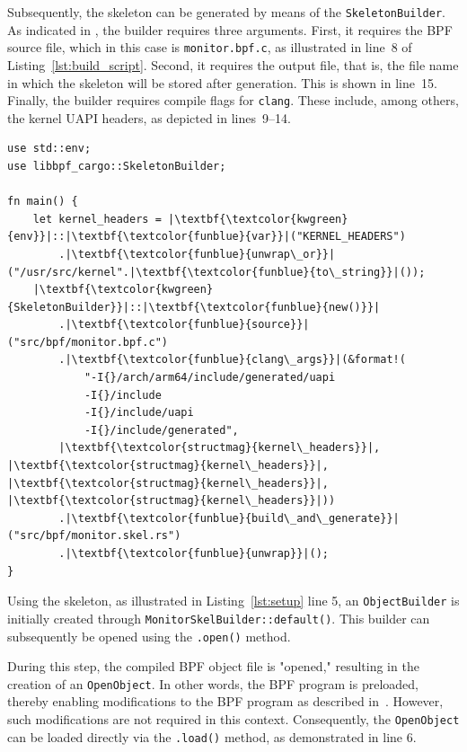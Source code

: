 Subsequently, the skeleton can be generated by means of the \texttt{SkeletonBuilder}.  
As indicated in \cite{skeleton}, the builder requires three arguments.  
First, it requires the \ac{BPF} source file, which in this case is \texttt{monitor.bpf.c}, as illustrated in line~8 of Listing~\ref{lst:build_script}.  
Second, it requires the output file, that is, the file name in which the skeleton will be stored after generation.  
This is shown in line~15.  
Finally, the builder requires compile flags for \texttt{clang}.  
These include, among others, the kernel UAPI headers, as depicted in lines~9--14.  

\begin{listing}[H]
    \centering
\begin{verbatim}
use std::env;
use libbpf_cargo::SkeletonBuilder;

fn main() {
    let kernel_headers = |\textbf{\textcolor{kwgreen}{env}}|::|\textbf{\textcolor{funblue}{var}}|("KERNEL_HEADERS")
        .|\textbf{\textcolor{funblue}{unwrap\_or}}|("/usr/src/kernel".|\textbf{\textcolor{funblue}{to\_string}}|());
    |\textbf{\textcolor{kwgreen}{SkeletonBuilder}}|::|\textbf{\textcolor{funblue}{new()}}|
        .|\textbf{\textcolor{funblue}{source}}|("src/bpf/monitor.bpf.c")
        .|\textbf{\textcolor{funblue}{clang\_args}}|(&format!(
            "-I{}/arch/arm64/include/generated/uapi 
            -I{}/include 
            -I{}/include/uapi 
            -I{}/include/generated", 
        |\textbf{\textcolor{structmag}{kernel\_headers}}|, |\textbf{\textcolor{structmag}{kernel\_headers}}|, |\textbf{\textcolor{structmag}{kernel\_headers}}|, |\textbf{\textcolor{structmag}{kernel\_headers}}|))
        .|\textbf{\textcolor{funblue}{build\_and\_generate}}|("src/bpf/monitor.skel.rs")
        .|\textbf{\textcolor{funblue}{unwrap}}|();
}
\end{verbatim}
\caption{Rust Build Script}
\label{lst:build_script}
\end{listing}

Using the skeleton, as illustrated in Listing~\ref{lst:setup} line 5, an \texttt{ObjectBuilder} is initially created through \texttt{MonitorSkelBuilder::default()}.  
This builder can subsequently be opened using the \texttt{.open()} method.  

During this step, the compiled \ac{BPF} object file is "opened," resulting in the creation of an \texttt{OpenObject}.  
In other words, the \ac{BPF} program is preloaded, thereby enabling modifications to the \ac{BPF} program as described in~\cite{libbpf-rs}.  
However, such modifications are not required in this context.  
Consequently, the \texttt{OpenObject} can be loaded directly via the \texttt{.load()} method, as demonstrated in line 6.  


